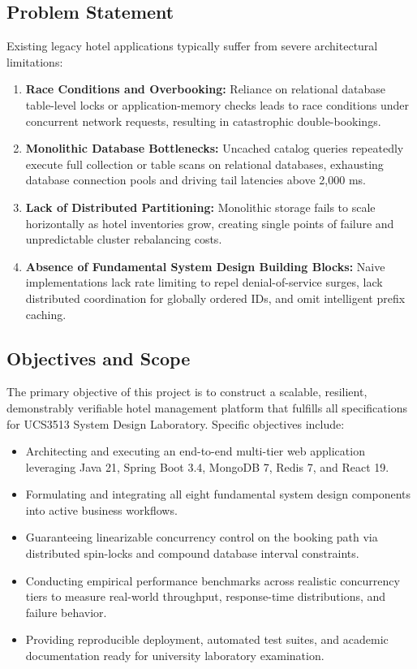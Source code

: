 \documentclass[11pt,a4paper]{article}
\begin{document}
\subsection{Problem Statement}
Existing legacy hotel applications typically suffer from severe architectural limitations:
\begin{enumerate}
    \item \textbf{Race Conditions and Overbooking:} Reliance on relational database table-level locks or application-memory checks leads to race conditions under concurrent network requests, resulting in catastrophic double-bookings.
    \item \textbf{Monolithic Database Bottlenecks:} Uncached catalog queries repeatedly execute full collection or table scans on relational databases, exhausting database connection pools and driving tail latencies above 2,000 ms.
    \item \textbf{Lack of Distributed Partitioning:} Monolithic storage fails to scale horizontally as hotel inventories grow, creating single points of failure and unpredictable cluster rebalancing costs.
    \item \textbf{Absence of Fundamental System Design Building Blocks:} Naive implementations lack rate limiting to repel denial-of-service surges, lack distributed coordination for globally ordered IDs, and omit intelligent prefix caching.
\end{enumerate}

\subsection{Objectives and Scope}
The primary objective of this project is to construct a scalable, resilient, demonstrably verifiable hotel management platform that fulfills all specifications for UCS3513 System Design Laboratory. Specific objectives include:
\begin{itemize}
    \item Architecting and executing an end-to-end multi-tier web application leveraging Java 21, Spring Boot 3.4, MongoDB 7, Redis 7, and React 19.
    \item Formulating and integrating all eight fundamental system design components into active business workflows.
    \item Guaranteeing linearizable concurrency control on the booking path via distributed spin-locks and compound database interval constraints.
    \item Conducting empirical performance benchmarks across realistic concurrency tiers to measure real-world throughput, response-time distributions, and failure behavior.
    \item Providing reproducible deployment, automated test suites, and academic documentation ready for university laboratory examination.
\end{itemize}
\end{document}
